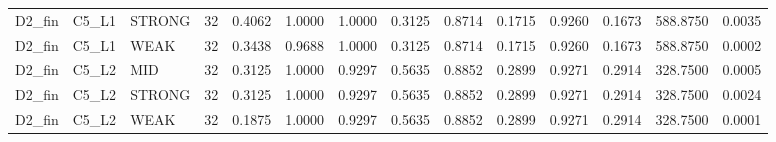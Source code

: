 \begin{tabular}{lllrrrrrrrrrrr}
D2\_fin & C5\_L1 & STRONG & 32 & 0.4062 & 1.0000 & 1.0000 & 0.3125 & 0.8714 & 0.1715 & 0.9260 & 0.1673 & 588.8750 & 0.0035 \\
D2\_fin & C5\_L1 & WEAK & 32 & 0.3438 & 0.9688 & 1.0000 & 0.3125 & 0.8714 & 0.1715 & 0.9260 & 0.1673 & 588.8750 & 0.0002 \\
D2\_fin & C5\_L2 & MID & 32 & 0.3125 & 1.0000 & 0.9297 & 0.5635 & 0.8852 & 0.2899 & 0.9271 & 0.2914 & 328.7500 & 0.0005 \\
D2\_fin & C5\_L2 & STRONG & 32 & 0.3125 & 1.0000 & 0.9297 & 0.5635 & 0.8852 & 0.2899 & 0.9271 & 0.2914 & 328.7500 & 0.0024 \\
D2\_fin & C5\_L2 & WEAK & 32 & 0.1875 & 1.0000 & 0.9297 & 0.5635 & 0.8852 & 0.2899 & 0.9271 & 0.2914 & 328.7500 & 0.0001 \\
\bottomrule
\end{tabular}
